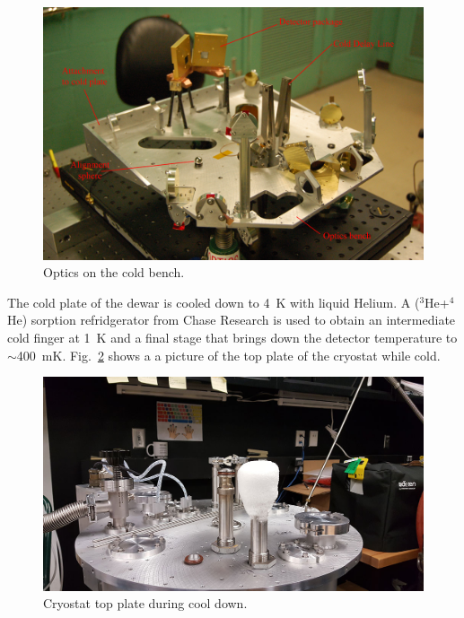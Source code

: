 \begin{figure}[!h]
		\centering
		\includegraphics[width=\textwidth]{Figures/ColdBench-anottated.jpg} 
		\caption[Cold bench]{Optics on the cold bench.}
		\label{fig:ColdBench}
\end{figure}

The cold plate of the dewar is cooled down to \SI{4}{\kelvin} with liquid Helium. A ($^3$He+$^4$He) sorption refridgerator from Chase Research is used to obtain an intermediate cold finger at \SI{1}{\kelvin} and a final stage that brings down the detector temperature to $\sim$\SI{400}{\milli\kelvin}. Fig.~\ref{fig:CryostatTopPlate} shows a a picture of the top plate of the cryostat while cold. 

\begin{figure}[!h]
		\centering
		\includegraphics[width=\textwidth]{Figures/Cryostat.jpg} 
		\caption[Cryostat top plate]{Cryostat top plate during cool down.}
		\label{fig:CryostatTopPlate}
\end{figure}


